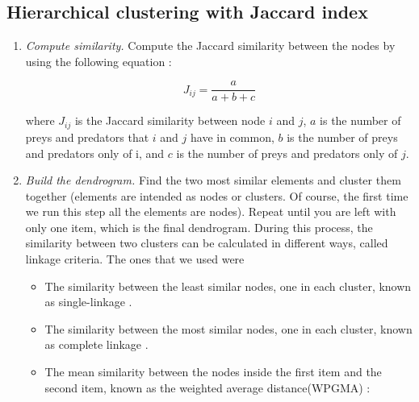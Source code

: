 \documentclass[twocolumn]{article}
\begin{document}



\onecolumn
\begin{appendices}

	\section{Hierarchical clustering with Jaccard index} \label{appendix:jaccard}

		\begin{enumerate}

			\item \emph{Compute similarity.} \smallskip \newline
						Compute the Jaccard similarity between the nodes by using the following equation \citep{Yodzis1999}:

										\begin{equation}
				      				J_{ij}=\frac{a}{a+b+c} \label{eqn:jaccard}
			      				\end{equation}

			      \noindent where $J_{ij}$ is the Jaccard similarity between node $i$ and $j$, $a$ is the number of preys and predators that $i$ and $j$ have in common, $b$ is the number of preys and predators only of i, and $c$ is the number of preys and predators only of $j$.

			\item \emph{Build the dendrogram.} \smallskip \newline
			      Find the two most similar elements and cluster them together (elements are intended as nodes or clusters. Of course, the first time we run this step all the elements are nodes). Repeat until you are left with only one item, which is the final dendrogram. During this process, the similarity between two clusters can be calculated in different ways, called linkage criteria. The ones that we used were

						\begin{itemize}
				      \item 	The similarity between the least similar nodes, one in each cluster, known as single-linkage \citep{Frigui2008}.
				      \item 	The similarity between the most similar nodes, one in each cluster, known as complete linkage \citep{Frigui2008}.
				      \item 	The mean similarity between the nodes inside the first item and the second item, known as the weighted average distance(WPGMA) \citep{Sokal1958}:


\end{itemize}
\end{enumerate}
\end{appendices}
\end{document}
